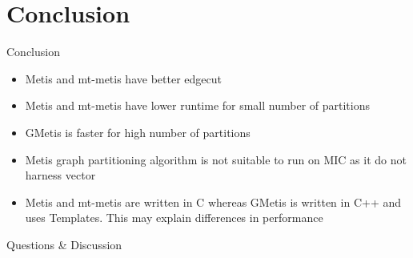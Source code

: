 \documentclass{beamer}
\begin{document}



\section{Conclusion}

\begin{frame}{Conclusion}
\begin{itemize}
  \item Metis and mt-metis have better edgecut
  \item Metis and mt-metis have lower runtime for small number of
    partitions
  \item GMetis is faster for high number of partitions
  \item Metis graph partitioning algorithm is not suitable to run on MIC
    as it do not harness vector
  \item Metis and mt-metis are written in C whereas GMetis is written in
    C++ and uses Templates. This may explain differences in performance
\end{itemize}
\end{frame}



\begin{frame}
  \titlepage
  \begin{center}
  \huge Questions \& Discussion
  \end{center}
\end{frame}
\end{document}
